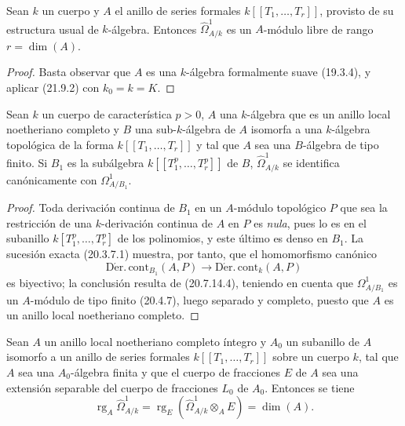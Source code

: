 \begin{corollary}[21.9.3]
\label{0.21.9.3-fr}
Sean $k$ un cuerpo y $A$ el anillo de series formales
$k[[T_1,\ldots,T_r]]$, provisto de su estructura usual de $k$-álgebra.
Entonces $\widehat\Omega^1_{A/k}$ es un $A$-módulo libre de rango
$r=\dim(A)$.
\end{corollary}

\begin{proof}
Basta observar que $A$ es una $k$-álgebra formalmente suave (19.3.4), y aplicar
(21.9.2) con $k_0=k=K$.
\end{proof}

\begin{lemma}[21.9.4]
\label{0.21.9.4-fr}
Sean $k$ un cuerpo de característica $p>0$, $A$ una $k$-álgebra que es un
anillo local noetheriano completo y $B$ una sub-$k$-álgebra de $A$ isomorfa a
una $k$-álgebra topológica de la forma $k[[T_1,\ldots,T_r]]$ y tal que $A$ sea
una $B$-álgebra de tipo finito. Si $B_1$ es la subálgebra
$k[[T_1^p,\ldots,T_r^p]]$ de $B$, $\widehat\Omega^1_{A/k}$ se identifica
canónicamente con $\Omega^1_{A/B_1}$.
\end{lemma}

\begin{proof}
Toda derivación continua de $B_1$ en un $A$-módulo topológico $P$ que sea la
restricción de una $k$-derivación continua de $A$ en $P$ es \emph{nula}, pues
lo es en el subanillo $k[T_1^p,\ldots,T_r^p]$ de los polinomios, y este último
es denso en $B_1$. La sucesión exacta (20.3.7.1) muestra, por tanto, que el
homomorfismo canónico
\[
  \operatorname{D\acute{e}r.\,cont}_{B_1}(A,P)
  \longrightarrow \operatorname{D\acute{e}r.\,cont}_k(A,P)
\]
es biyectivo; la conclusión resulta de (20.7.14.4), teniendo en cuenta que
$\Omega^1_{A/B_1}$ es un $A$-módulo de tipo finito (20.4.7), luego separado y
completo, puesto que $A$ es un anillo local noetheriano completo.
\end{proof}

\begin{proposition}[21.9.5]
\label{0.21.9.5-fr}
Sean $A$ un anillo local noetheriano completo íntegro y $A_0$ un subanillo de
$A$ isomorfo a un anillo de series formales $k[[T_1,\ldots,T_r]]$ sobre un
cuerpo $k$, tal que $A$ sea una $A_0$-álgebra \textup{finita} y que el cuerpo de
fracciones $E$ de $A$ sea una extensión \textup{separable} del cuerpo de fracciones
$L_0$ de $A_0$. Entonces se tiene
\begin{equation}
\tag{21.9.5.1}
\label{0.21.9.5.1-fr}
  \operatorname{rg}_A\widehat\Omega^1_{A/k}
  =\operatorname{rg}_E(\widehat\Omega^1_{A/k}\otimes_AE)=\dim(A).
\end{equation}
\end{proposition}

